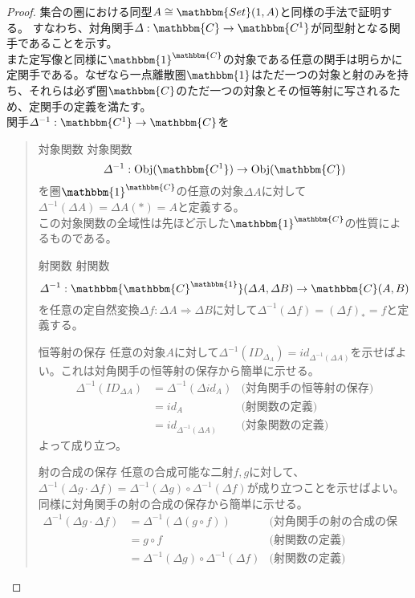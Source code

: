 \documentclass[uplatex,dvipdfmx]{jsarticle}
\newcommand{\cat}[1]{\mathbbm{#1}}
\newcommand{\arrow}{\rightarrow}
\newcommand{\functor}[3]{#1:\cat{#2}\arrow \cat{#3}}
\newcommand{\nat}[3]{#1:#2\Rightarrow #3}
\newcommand{\obj}[1]{\mathrm{Obj}(\cat{#1})}
\newcommand{\mor}[3]{#1:#2\arrow #3}
\newcommand{\arset}[3]{\cat{#1}(#2,#3)}
\newcommand{\funccat}[2]{\cat{#2}^\cat{#1}}
\newtheorem{proof}{証明}[section]
\numberwithin{proof}{subsection}
\newenvironment{mydescription}
{\begin{description}
  \setlength{\parskip}{0.5cm}
}
{\end{description}}
\begin{document}
  \begin{proof}
    集合の圏における同型$A\cong\arset{Set}{1}{A}$と同様の手法で証明する。
    すなわち、対角関手$\functor{\varDelta}{C}{C^1}$が同型射となる関手であることを示す。\\
    また定写像と同様に$\funccat{C}{1}$の対象である任意の関手は明らかに定関手である。なぜなら一点離散圏$\cat{1}$はただ一つの対象と射のみを持ち、それらは必ず圏$\cat{C}$のただ一つの対象とその恒等射に写されるため、定関手の定義を満たす。\\
    関手$\functor{\varDelta^{-1}}{C^1}{C}$を
    \begin{quote}
			\begin{mydescription}
				\item[対象関数]対象関数\[\mor{\varDelta^{-1}}{\obj{C^1}}{\obj{C}}\]を圏$\funccat{C}{1}$の任意の対象$\varDelta A$に対して$\varDelta^{-1}(\varDelta A)=\varDelta A(*)=A$と定義する。\\
        この対象関数の全域性は先ほど示した$\funccat{C}{1}$の性質によるものである。
				\item[射関数]射関数\[\mor{\varDelta^{-1}}{\arset{\funccat{1}{C}}{\varDelta A}{\varDelta B}}{\arset{C}{A}{B}}\]を任意の定自然変換$\nat{\varDelta f}{\varDelta A}{\varDelta B}$に対して$\varDelta^{-1}(\varDelta f) = (\varDelta f)_*=f$と定義する。
				\item[恒等射の保存]任意の対象$A$に対して$\varDelta^{-1}(ID_{\varDelta_A})=id_{\varDelta^{-1}(\varDelta A)}$を示せばよい。これは対角関手の恒等射の保存から簡単に示せる。
				\begin{align*}
          \varDelta^{-1}(ID_{\varDelta A})&=\varDelta^{-1}(\varDelta id_A)&\text{(対角関手の恒等射の保存)}\\
          &=id_A&\text{(射関数の定義)}\\
          &=id_{\varDelta^{-1}(\varDelta A)}&\text{(対象関数の定義)}
        \end{align*}
        よって成り立つ。
				\item[射の合成の保存]任意の合成可能な二射$f,g$に対して、$\varDelta^{-1}(\varDelta g\cdot\varDelta f)=\varDelta^{-1}(\varDelta g)\circ\varDelta^{-1}(\varDelta f)$が成り立つことを示せばよい。同様に対角関手の射の合成の保存から簡単に示せる。
				\begin{align*}
          \varDelta^{-1}(\varDelta g\cdot\varDelta f)&=\varDelta^{-1}(\varDelta(g\circ f))&\text{(対角関手の射の合成の保存)}\\
          &=g\circ f&\text{(射関数の定義)}\\
          &=\varDelta^{-1}(\varDelta g)\circ\varDelta^{-1}(\varDelta f)&\text{(射関数の定義)}

\end{align*}
\end{mydescription}
\end{quote}
\end{proof}
\end{document}
